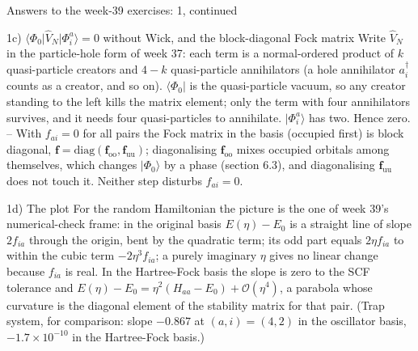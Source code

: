 \documentclass[aspectratio=169,10pt]{beamer}
\newcommand{\ket}[1]{\vert #1\rangle}
\newcommand{\bra}[1]{\langle #1\vert}
\newcommand{\element}[3]{\langle #1\vert #2\vert #3\rangle}
\newcommand{\bigO}{\mathcal{O}}
\begin{document}
\begin{frame}{Answers to the week-39 exercises: 1, continued}
  \footnotesize
  \begin{block}{1c) $\element{\Phi_0}{\hat V_N}{\Phi_i^a}=0$ without Wick, and the block-diagonal Fock matrix}
    Write $\hat V_N$ in the particle-hole form of week 37: each term is a normal-ordered product of $k$ quasi-particle creators and $4-k$ quasi-particle annihilators (a hole annihilator $a_i^{\dagger}$ counts as a creator, and so on). $\bra{\Phi_0}$ is the quasi-particle vacuum, so any creator standing to the left kills the matrix element; only the term with four annihilators survives, and it needs four quasi-particles to annihilate. $\ket{\Phi_i^a}$ has two. Hence zero. -- With $f_{ai}=0$ for all pairs the Fock matrix in the basis (occupied first) is block diagonal, $\bm f=\mathrm{diag}(\bm f_{\mathrm{oo}},\bm f_{\mathrm{uu}})$; diagonalising $\bm f_{\mathrm{oo}}$ mixes occupied orbitals among themselves, which changes $\ket{\Phi_0}$ by a phase (section 6.3), and diagonalising $\bm f_{\mathrm{uu}}$ does not touch it. Neither step disturbs $f_{ai}=0$.
  \end{block}
  \begin{block}{1d) The plot}
    For the random Hamiltonian the picture is the one of week 39's numerical-check frame: in the original basis $E(\eta)-E_0$ is a straight line of slope $2f_{ia}$ through the origin, bent by the quadratic term; its odd part equals $2\eta f_{ia}$ to within the cubic term $-2\eta^3f_{ia}$; a purely imaginary $\eta$ gives no linear change because $f_{ia}$ is real. In the Hartree-Fock basis the slope is zero to the SCF tolerance and $E(\eta)-E_0=\eta^2(H_{aa}-E_0)+\bigO(\eta^4)$, a parabola whose curvature is the diagonal element of the stability matrix for that pair. (Trap system, for comparison: slope $-0.867$ at $(a,i)=(4,2)$ in the oscillator basis, $-1.7\times10^{-10}$ in the Hartree-Fock basis.)
  \end{block}
\end{frame}
\end{document}
